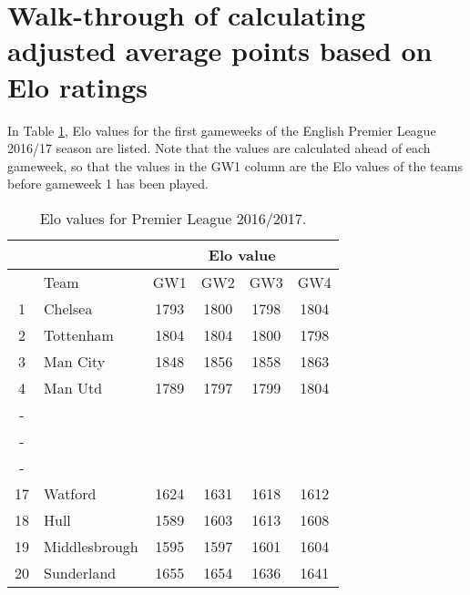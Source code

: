 \section{Walk-through of calculating adjusted average points based on Elo ratings } \label{app_walk_through}


In Table \ref{tab:Elo.1617_app}, Elo values for the first gameweeks of the English Premier League 2016/17 season are listed. Note that the values are calculated ahead of each gameweek, so that the values in the GW1 column are the Elo values of the teams before gameweek 1 has been played. 

\begin{table}[H]
\centering
\begin{tabular}{|c|l|c|c|c|c|}
\cline{2-6}
\multicolumn{1}{l|}{} & \multicolumn{1}{l|}{} & \multicolumn{4}{c|}{Elo value}  \\ \cline{2-6} 
\hline
                      & Team                  & GW1    & GW2    & GW3  & GW4    \\
                      \hline
1                     & Chelsea               & 1793   & 1800   & 1798 & 1804   \\
2                     & Tottenham             & 1804   & 1804   & 1800 & 1798   \\
3                     & Man City              & 1848   & 1856   & 1858 & 1863   \\
4                     & Man Utd               & 1789   & 1797   & 1799 & 1804   \\
-                     &                       &        &        &      &        \\
-                     &                       &        &        &      &        \\
-                     &                       &        &        &      &        \\
17                    & Watford               & 1624   & 1631   & 1618 & 1612   \\
18                    & Hull                  & 1589   & 1603   & 1613 & 1608   \\
19                    & Middlesbrough         & 1595   & 1597   & 1601 & 1604   \\
20                    & Sunderland            & 1655   & 1654   & 1636 & 1641   \\
\hline
\end{tabular}
\caption{Elo values for Premier League 2016/2017.}
\label{tab:Elo.1617_app}
\end{table}

